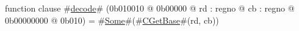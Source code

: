 function clause #\hyperref[zdecode]{decode}# (0b010010 @ 0b00000 @ rd : regno @ cb : regno @ 0b00000000 @ 0b010) = #\hyperref[zSome]{Some}#(#\hyperref[zCGetBase]{CGetBase}#(rd, cb))
